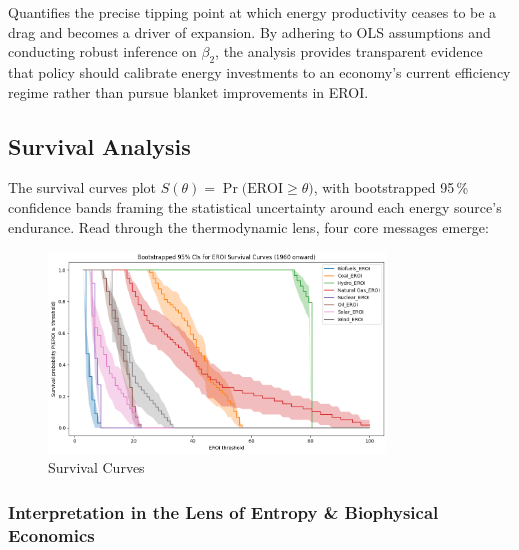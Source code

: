 \documentclass[a4paper,12pt]{article}
\begin{document}
 Quantifies the precise tipping point at which energy productivity ceases to be a drag and becomes a driver of expansion. By adhering to OLS assumptions and conducting robust inference on \( \beta_{2} \), the analysis provides transparent evidence that policy should calibrate energy investments to an economy’s current efficiency regime rather than pursue blanket improvements in EROI.


\subsection{Survival Analysis}
The survival curves plot \( S(\theta)=\Pr\!\bigl(\text{EROI}\ge\theta\bigr) \), with bootstrapped 95\,\% confidence bands framing the statistical uncertainty around each energy source’s endurance. Read through the thermodynamic lens, four core messages emerge:

\begin{figure}[H]
    \centering
    \includegraphics[width=0.8\textwidth]{figures/eroi_survival_analysis.png}
    \caption{Survival Curves}
    \label{fig:yourlabel}
\end{figure}

\subsubsection*{Interpretation in the Lens of Entropy \& Biophysical Economics}
\end{document}
